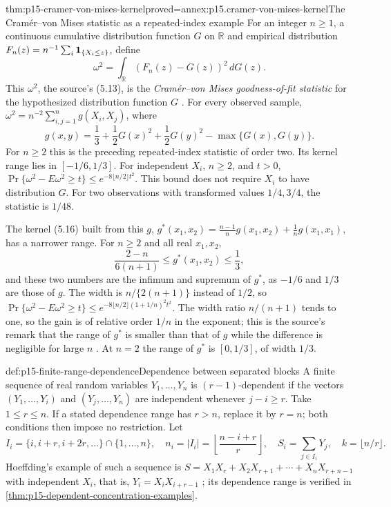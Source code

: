 \begin{hbtheorem}{thm:p15-cramer-von-mises-kernel}{proved=annex:p15.cramer-von-mises-kernel}{The Cram\'er--von Mises statistic as a repeated-index example}
For an integer \(n\geq1\), a continuous cumulative distribution function
\(G\) on \(\mathbb R\)
and empirical distribution \(F_n(z)=n^{-1}\sum_i{\bf1}_{\{X_i\leq z\}}\),
define
\[
 \omega^2=\int_{\mathbb R}(F_n(z)-G(z))^2\,dG(z).
\]
This \(\omega^2\), the source's (5.13), is the
\emph{Cram\'er--von Mises goodness-of-fit statistic} for the
hypothesized distribution function \(G\)
\cite[p.~26]{Hoeffding1963BoundedSums}.
For every observed sample,
\(\omega^2=n^{-2}\sum_{i,j=1}^n g(X_i,X_j)\), where
\[
 g(x,y)=\frac13+\frac12G(x)^2+\frac12G(y)^2-\max\{G(x),G(y)\}.
\]
For \(n\geq2\) this is the preceding repeated-index statistic of order two.
Its kernel range lies in \([-1/6,1/3]\). For independent \(X_i\),
\(n\geq2\), and \(t>0\),
\(\Pr\{\omega^2-E\omega^2\geq t\}\leq e^{-8\lfloor n/2\rfloor t^2}\).
This bound does not require \(X_i\) to have distribution \(G\).
For two observations with transformed values \(1/4,3/4\),
the statistic is \(1/48\).

The kernel (5.16) built from this \(g\),
\(g^*(x_1,x_2)=\frac{n-1}ng(x_1,x_2)+\frac1ng(x_1,x_1)\), has a
narrower range. For \(n\geq2\) and all real \(x_1,x_2\),
\[
 \frac{2-n}{6(n+1)}\leq g^*(x_1,x_2)\leq\frac13,
\]
and these two numbers are the infimum and supremum of \(g^*\), as
\(-1/6\) and \(1/3\) are those of \(g\). The width is
\(n/\{2(n+1)\}\) instead of \(1/2\), so
\(\Pr\{\omega^2-E\omega^2\geq t\}
 \leq e^{-8\lfloor n/2\rfloor(1+1/n)^2t^2}\).
The width ratio \(n/(n+1)\) tends to one, so the gain is of relative
order \(1/n\) in the exponent; this is the source's remark that the
range of \(g^*\) is smaller than that of \(g\) while the difference is
negligible for large \(n\) \cite[p.~27]{Hoeffding1963BoundedSums}.
At \(n=2\) the range of \(g^*\) is \([0,1/3]\), of width \(1/3\).
\end{hbtheorem}

\begin{hbdefinition}{def:p15-finite-range-dependence}{Dependence between separated blocks}
A finite sequence of real random variables \(Y_1,\ldots,Y_n\)
is \((r-1)\)-dependent if
the vectors \((Y_1,\ldots,Y_i)\) and \((Y_j,\ldots,Y_n)\) are independent
whenever \(j-i\geq r\). Take \(1\leq r\leq n\).
If a stated dependence range has \(r>n\), replace it by \(r=n\);
both conditions then impose no restriction.
Let
\[
 I_i=\{i,i+r,i+2r,\ldots\}\cap\{1,\ldots,n\},\quad
 n_i=|I_i|=\left\lfloor\frac{n-i+r}{r}\right\rfloor,\quad
 S_i=\sum_{j\in I_i}Y_j,\quad k=\lfloor n/r\rfloor .
\]
Hoeffding's example of such a sequence is
\(S=X_1X_r+X_2X_{r+1}+\cdots+X_nX_{r+n-1}\) with independent \(X_i\),
that is, \(Y_i=X_iX_{i+r-1}\) \cite[p.~27]{Hoeffding1963BoundedSums};
its dependence range is verified in
\cref{thm:p15-dependent-concentration-examples}.
\end{hbdefinition}

